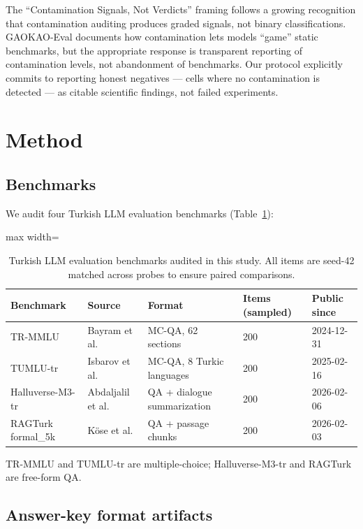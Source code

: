 \documentclass[11pt]{article}
\begin{document}
The ``Contamination Signals, Not Verdicts'' framing follows a growing recognition that contamination auditing produces graded signals, not binary classifications. GAOKAO-Eval \cite{gaokao2024} documents how contamination lets models ``game'' static benchmarks, but the appropriate response is transparent reporting of contamination levels, not abandonment of benchmarks. Our protocol explicitly commits to reporting honest negatives --- cells where no contamination is detected --- as citable scientific findings, not failed experiments.

\section{Method}

\subsection{Benchmarks}

We audit four Turkish LLM evaluation benchmarks (Table~\ref{tab:benchmarks}):

\begin{table}[t]
\centering
\begin{adjustbox}{max width=\textwidth}
\begin{tabular}{lllll}
\toprule
\textbf{Benchmark} & \textbf{Source} & \textbf{Format} & \textbf{Items (sampled)} & \textbf{Public since} \\
\midrule
TR-MMLU & Bayram et al. \cite{trmmu2024} & MC-QA, 62 sections & 200 & 2024-12-31 \\
TUMLU-tr & Isbarov et al. \cite{tumlu2025} & MC-QA, 8 Turkic languages & 200 & 2025-02-16 \\
Halluverse-M3-tr & Abdaljalil et al. \cite{halluverse2026} & QA + dialogue summarization & 200 & 2026-02-06 \\
RAGTurk formal\_5k & K{\"o}se et al. \cite{ragturk2026} & QA + passage chunks & 200 & 2026-02-03 \\
\bottomrule
\end{tabular}%
\end{adjustbox}
\caption{Turkish LLM evaluation benchmarks audited in this study. All items are seed-42 matched across probes to ensure paired comparisons.}
\label{tab:benchmarks}
\end{table}

TR-MMLU and TUMLU-tr are multiple-choice; Halluverse-M3-tr and RAGTurk are free-form QA.

\subsection{Answer-key format artifacts}
\end{document}
